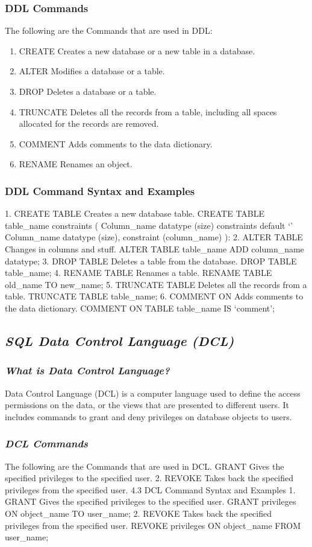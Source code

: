 \documentclass{article}
\begin{document}
\subsubsection{\textbf {DDL Commands}}
The following are the Commands that are used in DDL:
\begin{enumerate}
    \item CREATE \- Creates a new database or a new table in a database.
    \item ALTER \- Modifies a database or a table.
    \item DROP \- Deletes a database or a table.
    \item TRUNCATE \- Deletes all the records from a table, including all spaces allocated for the records are removed.
    \item COMMENT \- Adds comments to the data dictionary.
    \item RENAME \- Renames an object.
    
\end{enumerate}
\subsubsection{\textbf{DDL Command Syntax and Examples}}
1. CREATE TABLE \- Creates a new database table.
CREATE TABLE table\_name constraints
(
Column\_name datatype (size) constraints default `'
Column\_name datatype (size), constraint (column\_name)
):
2. ALTER TABLE \- Changes in columns and stuff.
ALTER TABLE table\_name
ADD column\_name datatype;
3. DROP TABLE \- Deletes a table from the database.
DROP TABLE table\_name;
4. RENAME TABLE \- Renames a table.
RENAME TABLE old\_name TO new\_name;
5. TRUNCATE TABLE \- Deletes all the records from a table.
TRUNCATE TABLE table\_name;
6. COMMENT ON \- Adds comments to the data dictionary.
COMMENT ON TABLE table\_name IS `comment';
\subsection{\textit{SQL Data Control Language (DCL)}}
\subsubsection{\textit{What is Data Control Language?}}
Data Control Language (DCL) is a computer language used to define the access permissions on the data, or the views that are presented to different users. It includes commands to grant and deny privileges on database objects to users.
\subsubsection{\textit{DCL Commands}}
The following are the Commands that are used in DCL. GRANT \- Gives the specified privileges to the specified user.
2. REVOKE \- Takes back the specified privileges from the specified user.
4.3 DCL Command Syntax and Examples
1. GRANT \- Gives the specified privileges to the specified user.
GRANT privileges ON object\_name TO user\_name;
2. REVOKE \- Takes back the specified privileges from the specified user.
REVOKE privileges ON object\_name FROM user\_name;
\end{document}
